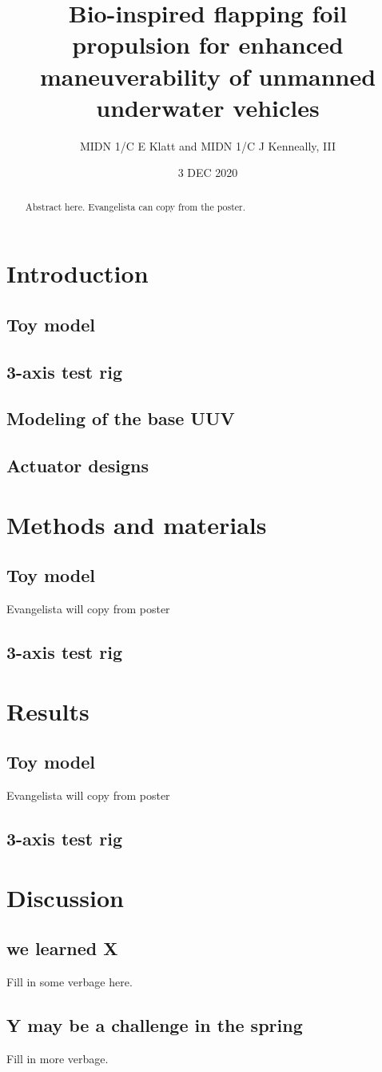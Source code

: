 \documentclass[10pt]{article}
\title{Bio-inspired flapping foil propulsion for enhanced maneuverability of unmanned underwater vehicles}
\author{MIDN 1/C E Klatt and MIDN 1/C J Kenneally, III}
\date{3 DEC 2020}
\begin{document}
\maketitle
\begin{abstract}
    Abstract here. Evangelista can copy from the poster. 
\end{abstract}

\section{Introduction}
\subsection{Toy model}
\subsection{3-axis test rig}
\subsection{Modeling of the base UUV}
\subsection{Actuator designs}

\section{Methods and materials}
\subsection{Toy model}
Evangelista will copy from poster
\subsection{3-axis test rig}

\section{Results}
\subsection{Toy model}
Evangelista will copy from poster
\subsection{3-axis test rig}

\section{Discussion}
\subsection{we learned X}
Fill in some verbage here.

\subsection{Y may be a challenge in the spring}
Fill in more verbage.

\end{document}

